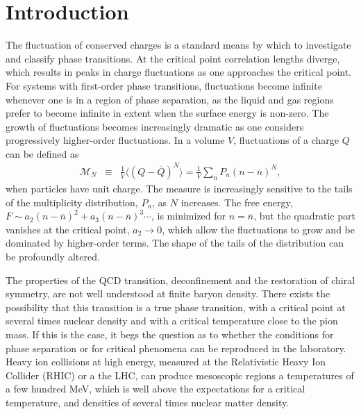 
\section{Introduction}\label{sec:intro}

The fluctuation of conserved charges is a standard means by which to investigate and classify phase transitions. At the critical point correlation lengths diverge, which results in peaks in charge fluctuations as one approaches the critical point. For systems with first-order phase transitions, fluctuations become infinite whenever one is in a region of phase separation, as the liquid and gas regions prefer to become infinite in extent when the surface energy is non-zero. The growth of fluctuations becomes increasingly dramatic as one considers progressively higher-order fluctuations. In a volume $V$, fluctuations of a charge $Q$ can be defined as
\begin{eqnarray}\label{eq:kappadef}
\mathcal{M}_N&\equiv&\frac{1}{V}\langle(Q-\overline{Q})^N\rangle=\frac{1}{V}\sum_n P_n(n-\overline{n})^N,
\end{eqnarray}
when particles have unit charge. The measure is increasingly sensitive to the tails of the multiplicity distribution, $P_n$, as $N$ increases. The free energy, $F\sim a_2(n-\overline{n})^2 + a_3(n-\overline{n})^3\cdots$, is minimized for $n=\overline{n}$, but the quadratic part vanishes at the critical point, $a_2\rightarrow 0$, which allow the fluctuations to grow and be dominated by higher-order terms. The shape of the tails of the distribution can be profoundly altered. 

The properties of the QCD  transition, deconfinement and the restoration of chiral symmetry, are not well understood at finite baryon density. There exists the possibility that this transition is a true phase transition, with a critical point at several times nuclear density and with a critical temperature close to the pion mass. If this is the case, it begs the question as to whether the conditions for phase separation or for critical phenomena can be reproduced in the laboratory. Heavy ion collisions at high energy, measured at the Relativistic Heavy Ion Collider (RHIC) or a the LHC, can produce mesoscopic regions a temperatures of a few hundred MeV, which is well above the expectations for a critical temperature, and densities of several times nuclear matter density. 

